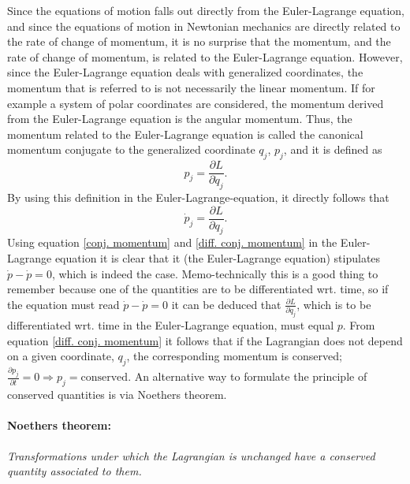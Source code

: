 Since the equations of motion falls out directly from the Euler-Lagrange equation, and since the equations of motion in Newtonian mechanics are directly related to the rate of change of momentum, it is no surprise that the momentum, and the rate of change of momentum, is related to the Euler-Lagrange equation. However, since the Euler-Lagrange equation deals with generalized coordinates, the momentum that is referred to is not necessarily the linear momentum. If for example a system of polar coordinates are considered, the momentum derived from the Euler-Lagrange equation is the angular momentum. Thus, the momentum related to the Euler-Lagrange equation is called the canonical momentum conjugate  to the generalized coordinate $q_j$, $p_j$, and it is defined as
\begin{equation}
	p_j=\frac{\partial L}{\partial \dot{q}_j}.
	\label{conj. momentum}
\end{equation} 
By using this definition in the Euler-Lagrange-equation, it directly follows that
\begin{equation}
	\dot{p}_j=\frac{\partial L}{\partial q_j}.
	\label{diff. conj. momentum}
\end{equation} 
Using equation \eqref{conj. momentum} and \eqref{diff. conj. momentum} in the Euler-Lagrange equation it is clear that it (the Euler-Lagrange equation) stipulates $\dot{p}-\dot{p}=0$, which is indeed the case. Memo-technically this is a good thing to remember because one of the quantities are to be differentiated wrt. time, so if the equation must read $\dot{p}-\dot{p}=0$ it can be deduced that $\frac{\partial L}{\partial \dot{q}_j}$, which is to be differentiated wrt. time in the Euler-Lagrange equation, must equal $p$. From equation \eqref{diff. conj. momentum} it follows that if the Lagrangian does not depend on a given coordinate, $q_j$, the corresponding momentum is conserved; $\frac{\partial p_j}{\partial t}=0\Rightarrow p_j=\mbox{conserved}$. An alternative way to formulate the principle of conserved quantities is via Noethers theorem.

\paragraph{Noethers theorem:}\emph{Transformations under which the Lagrangian is unchanged have a conserved quantity associated to them.}


